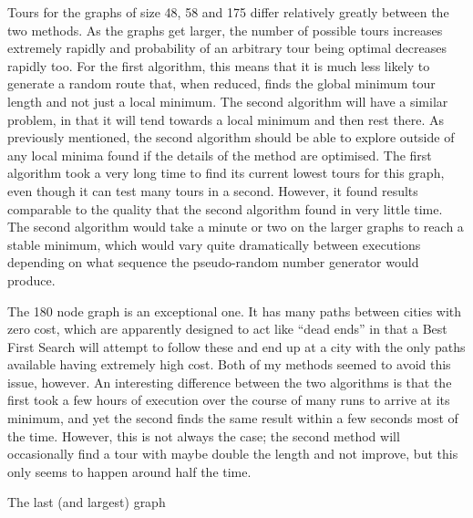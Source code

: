 \documentclass[a4paper,11pt]{article}
\begin{document}
Tours for the graphs of size 48, 58 and 175 differ relatively greatly between
the two methods. As the graphs get larger, the number of possible tours
increases extremely rapidly and probability of an arbitrary tour being optimal
decreases rapidly too. For the first algorithm, this means that it is much less
likely to generate a random route that, when reduced, finds the global minimum
tour length and not just a local minimum. The second algorithm will have a
similar problem, in that it will tend towards a local minimum and then rest
there. As previously mentioned, the second algorithm should be able to explore
outside of any local minima found if the details of the method are optimised.
The first algorithm took a very long time to find its current lowest tours for
this graph, even though it can test many tours in a second. However, it found
results comparable to the quality that the second algorithm found in very
little time. The second algorithm would take a minute or two on the larger
graphs to reach a stable minimum, which would vary quite dramatically between
executions depending on what sequence the pseudo-random number generator would
produce.

The 180 node graph is an exceptional one. It has many paths between cities with
zero cost, which are apparently designed to act like ``dead ends'' in that a
Best First Search will attempt to follow these and end up at a city with the
only paths available having extremely high cost. Both of my methods seemed to
avoid this issue, however. An interesting difference between the two algorithms
is that the first took a few hours of execution over the course of many runs to 
arrive at its minimum, and yet the second finds the same result within a few 
seconds most of the time. However, this is not always the case; the second
method will occasionally find a tour with maybe double the length and not
improve, but this only seems to happen around half the time.

The last (and largest) graph 
\end{document}
